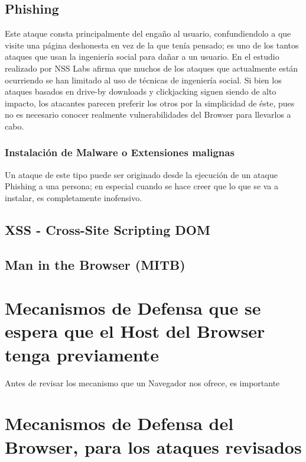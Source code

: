 \subsection{Phishing}
Este ataque consta principalmente del engaño al usuario, confundiendolo a que visite una página deshonesta en vez de la que tenía pensado; es uno de los tantos ataques que usan la ingeniería social para dañar a un usuario. En el estudio realizado por NSS Labs \cite{browSecPhish} afirma que muchos de los ataques que actualmente están ocurriendo se han limitado al uso de técnicas de ingeniería social. Si bien los ataques basados en drive-by downloads y clickjacking siguen siendo de alto impacto, los atacantes parecen preferir los otros por la simplicidad de éste, pues no es necesario conocer realmente vulnerabilidades del Browser para llevarlos a cabo. 
	\subsubsection{Instalación de Malware o Extensiones malignas}
	Un ataque de este tipo puede ser originado desde la ejecución de un ataque Phishing a una persona; en especial cuando se hace creer que lo que se va a instalar, es completamente inofensivo.

\subsection{XSS - Cross-Site Scripting DOM}


\subsection{Man in the Browser (MITB)}



\section{Mecanismos de Defensa que se espera que el Host del Browser tenga previamente}
	Antes de revisar los mecanismo que un Navegador nos ofrece, es importante 


\section{Mecanismos de Defensa del Browser, para los ataques revisados}

